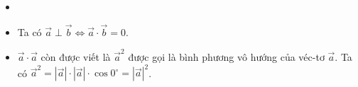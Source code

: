 \begin{note}
	\begin{itemize}
		\item []
		\item Ta có $\overrightarrow{a} \perp \overrightarrow{b} \Leftrightarrow \overrightarrow{a} \cdot \overrightarrow{b} = 0$.
		\item $\overrightarrow{a}\cdot \overrightarrow{a}$ còn được viết là $\overrightarrow{a}^2$ được gọi là bình phương vô hướng của véc-tơ $\overrightarrow{a}$. Ta có $\overrightarrow{a}^2 = |\overrightarrow{a}|\cdot |\overrightarrow{a}|\cdot \cos 0^\circ = |\overrightarrow{a}|^2$.
	\end{itemize}
\end{note}
